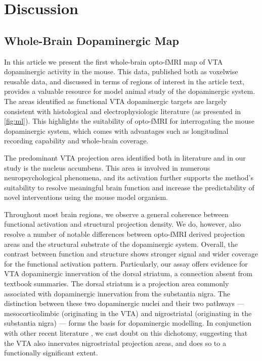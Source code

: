 \section{Discussion}

\subsection{Whole-Brain Dopaminergic Map}

In this article we present the first whole-brain opto-fMRI map of VTA dopaminergic activity in the mouse.
This data, published both as voxelwise reusable data, and discussed in terms of regions of interest in the article text, provides a valuable resource for model animal study of the dopaminergic system.
The areas identified as functional VTA dopaminergic targets are largely consistent with histological and electrophysiologic literature (as presented in \cref{fig:ml}).
This highlights the suitability of opto-fMRI for interrogating the mouse dopaminergic system, which comes with advantages such as longitudinal recording capability and whole-brain coverage.

The predominant VTA projection area identified both in literature and in our study is the nucleus accumbens.
This area is involved in numerous neuropsychological phenomena, and its activation further supports the method's suitability to resolve meaningful brain function and increase the predictability of novel interventions using the mouse model organism.

Throughout most brain regions, we observe a general coherence between functional activation and structural projection density.
We do, however, also resolve a number of notable differences between opto-fMRI derived projection areas and the structural substrate of the dopaminergic system.
Overall, the contrast between function and structure shows stronger signal and wider coverage for the functional activation pattern.
Particularly, our assay offers evidence for VTA dopaminergic innervation of the dorsal striatum, a connection absent from textbook summaries.
The dorsal striatum is a projection area commonly associated with dopaminergic innervation from the substantia nigra.
The distinction between these two dopaminergic nuclei and their two pathways --- mesocorticolimbic (originating in the VTA) and nigrostriatal (originating in the substantia nigra) --- forms the basis for dopaminergic modelling.
In conjunction with other recent literature \cite{Lohani2016,Pan2010}, we cast doubt on this dichotomy, suggesting that the VTA also innervates nigrostriatal projection areas, and does so to a functionally significant extent.

